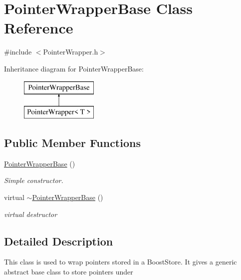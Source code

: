 \hypertarget{classPointerWrapperBase}{\section{Pointer\-Wrapper\-Base Class Reference}
\label{classPointerWrapperBase}
}


{\ttfamily \#include $<$Pointer\-Wrapper.\-h$>$}

Inheritance diagram for Pointer\-Wrapper\-Base\-:\begin{figure}[H]
\begin{center}
\leavevmode
\includegraphics[height=2.000000cm]{classPointerWrapperBase}
\end{center}
\end{figure}
\subsection*{Public Member Functions}
\begin{DoxyCompactItemize}
\item 
\hypertarget{classPointerWrapperBase_ac9e248557a8aa248bcbbadc469c77f52}{\hyperlink{classPointerWrapperBase_ac9e248557a8aa248bcbbadc469c77f52}{Pointer\-Wrapper\-Base} ()}\label{classPointerWrapperBase_ac9e248557a8aa248bcbbadc469c77f52}

\begin{DoxyCompactList}\small\item\em Simple constructor. \end{DoxyCompactList}\item 
\hypertarget{classPointerWrapperBase_a842fb0af38187d71678971452c1e1094}{virtual \hyperlink{classPointerWrapperBase_a842fb0af38187d71678971452c1e1094}{$\sim$\-Pointer\-Wrapper\-Base} ()}\label{classPointerWrapperBase_a842fb0af38187d71678971452c1e1094}

\begin{DoxyCompactList}\small\item\em virtual destructor \end{DoxyCompactList}\end{DoxyCompactItemize}


\subsection{Detailed Description}
This class is used to wrap pointers stored in a Boost\-Store. It gives a generic abstract base class to store pointers under

